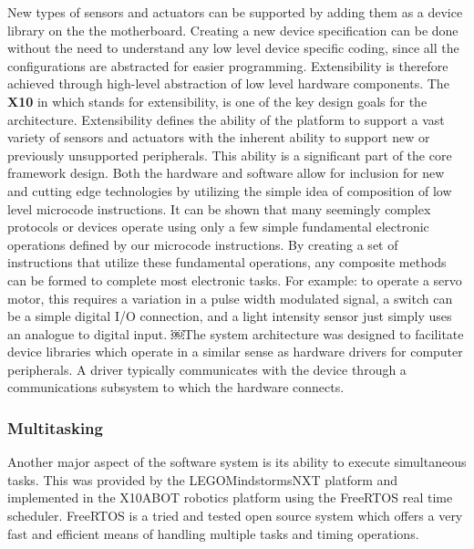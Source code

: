 	New types of sensors and actuators can be supported by adding them as a device library on the the \xten motherboard. Creating a new device specification can be done without the need to understand any low level device specific coding, since all the configurations are abstracted for easier programming. Extensibility is therefore achieved through high-level abstraction of low level hardware components.
	The \textbf{X10} in \xten which stands for extensibility, is one of the key design goals for the architecture. Extensibility defines the ability of the platform to support a vast variety of sensors and actuators with the inherent ability to support new or previously unsupported peripherals. This ability is a significant part of the core framework design. Both the hardware and software allow for inclusion for new and cutting edge technologies by utilizing the simple idea of composition of low level microcode instructions. It can be shown that many seemingly complex protocols or devices operate using only a few simple fundamental electronic operations defined by our microcode instructions\cite{CITE OR SHOW EXAMPLES}. By creating a set of instructions that utilize these fundamental operations, any composite methods can be formed to complete most electronic tasks. For example: to operate a servo motor, this requires a variation in a pulse width modulated signal, a switch can be a simple digital I/O connection, and a light intensity sensor just simply uses an analogue to digital input. 
	￼The \xten system architecture was designed to facilitate device libraries which operate in a similar sense as hardware drivers for computer peripherals. A driver typically communicates with the device through a communications subsystem to which the hardware connects.	
	
	\subsubsection{Multitasking} %
	\label{ssub:multitasking}
	
	Another major aspect of the software system is its ability to execute simultaneous tasks. This was provided by the LEGO\textregistered Mindstorms\textregistered NXT platform and implemented in the X10ABOT robotics platform using the FreeRTOS real time scheduler. FreeRTOS is a tried and tested open source system which offers a very fast and efficient means of handling multiple tasks and timing operations.
	
